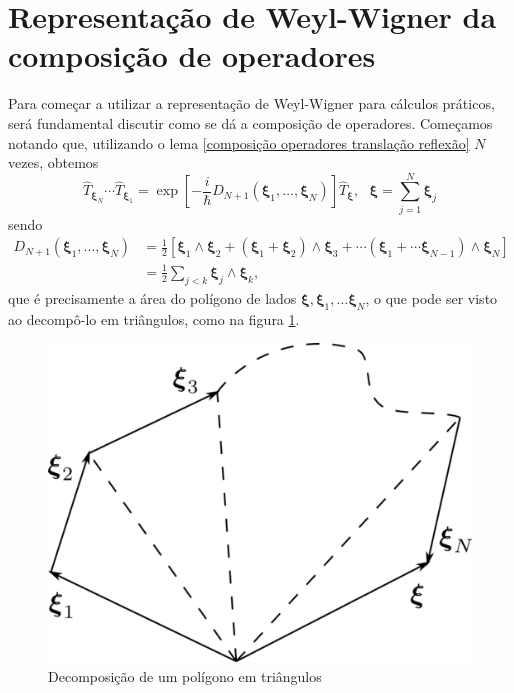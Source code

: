 \documentclass[
	12pt,
	oneside,			%
	a4paper,			%
	english,			%
	brazil				%
	]{abntex2}
\theoremstyle{definition}
\begin{document}
\section{Representação de Weyl-Wigner da composição de operadores}
\label{Representação de Weyl-Wigner da composição de operadores}

Para começar a utilizar a representação de Weyl-Wigner para cálculos práticos, será fundamental discutir como se dá a composição de operadores. Começamos notando que, utilizando o lema \ref{composição operadores translação reflexão} $N$ vezes, obtemos
\begin{equation}
    \hat{T}_{\boldsymbol{\xi}_N} \cdots \hat{T}_{\boldsymbol{\xi}_1} = \exp\left[-\frac{i}{\hbar}D_{N+1}\left(\boldsymbol{\xi}_1,\ldots,\boldsymbol{\xi}_N\right)\right] \hat{T}_{\boldsymbol{\xi}}, \ \ \  \boldsymbol{\xi} = \sum_{j=1}^N \boldsymbol{\xi}_j
\end{equation}
sendo
\begin{equation}
    \label{área em termos das cordas}
    \begin{aligned}
        D_{N+1}\left(\boldsymbol{\xi}_1,\ldots,\boldsymbol{\xi}_N\right) &= \frac{1}{2}\left[\boldsymbol{\xi}_1 \wedge \boldsymbol{\xi}_2 + \left(\boldsymbol{\xi}_1+\boldsymbol{\xi}_2\right)\wedge\boldsymbol{\xi}_3 + \cdots \left(\boldsymbol{\xi}_1 + \cdots \boldsymbol{\xi}_{N-1}\right)\wedge\boldsymbol{\xi}_N\right] \\
        &= \frac{1}{2} \sum_{j < k} \boldsymbol{\xi}_j \wedge \boldsymbol{\xi}_k,
    \end{aligned}
\end{equation}
que é precisamente a área do polígono de lados $\boldsymbol{\xi},\boldsymbol{\xi}_1,\ldots\boldsymbol{\xi}_N$, o que pode ser visto ao decompô-lo em triângulos, como na figura \ref{area em termos da corda}.

\begin{figure}[H]
    \includegraphics[width=.5\textwidth]{Imagens/area_em_termos_da_corda.png}
    \centering
    \caption{Decomposição de um polígono em triângulos}
    \label{area em termos da corda}
\end{figure}
\end{document}
